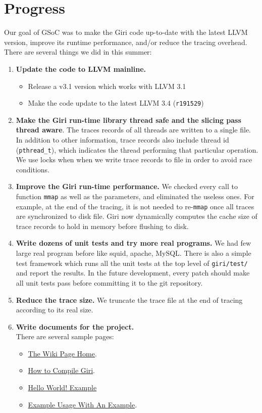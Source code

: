 \documentclass[DIV=calc, paper=a4, fontsize=11pt, twocolumn]{scrartcl}
\begin{document}
\section{Progress}
\label{sec:progress}
Our goal of GSoC was to make the Giri code up-to-date with the latest LLVM version, improve its runtime performance, and/or reduce the tracing overhead.
There are several things we did in this summer:
\begin{enumerate}
	\item \textbf{Update the code to LLVM mainline.}
		\begin{itemize}
			\item Release a v3.1 version which works with LLVM 3.1
			\item Make the code update to the latest LLVM 3.4 (\texttt{r191529})
		\end{itemize}
	\item \textbf{Make the Giri run-time library thread safe and the slicing pass thread aware}.
		The traces records of all threads are written to a single file.
		In addition to other information, trace records also include thread id (\texttt{pthread\_t}),
		which indicates the thread performing that particular operation.
		We use locks when when we write trace records to file in order to avoid race conditions.
	\item \textbf{Improve the Giri run-time performance.}
		We checked every call to function \texttt{mmap} as well as the parameters, and eliminated the useless ones.
		For example, at the end of the tracing, it is not needed to re-\texttt{mmap} once all traces are synchronized to disk file.
		Giri now dynamically computes the cache size of trace records to hold in memory before flushing to disk.
	\item \textbf{Write dozens of unit tests and try more real programs.}
		We had few large real program before like squid, apache, MySQL.
		There is also a simple test framework which runs all the unit tests at the top level of \texttt{giri/test/} and report the results.
		In the future development, every patch should make all unit tests pass before committing it to the git repository.
	\item \textbf{Reduce the trace size.}
		We truncate the trace file at the end of tracing according to its real size.
	\item \textbf{Write documents for the project.}\\
		There are several sample pages:
		\begin{itemize}
			\item \href{https://github.com/liuml07/giri/wiki}{The Wiki Page Home}.
			\item \href{https://github.com/liuml07/giri/wiki/How-to-Compile-Giri}{How to Compile Giri}.
			\item \href{https://github.com/liuml07/giri/wiki/Hello-World}{Hello World! Example}
			\item \href{https://github.com/liuml07/giri/wiki/Example-Usage}{Example Usage With An Example}.
		\end{itemize}
\end{enumerate}
\end{document}
